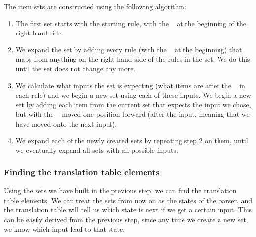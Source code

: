 The item sets are constructed using the following algorithm:
\begin{enumerate}
\item The first set starts with the starting rule, with the \textbullet ~ at the beginning of the right hand side.
\item We expand the set by adding every rule (with the \textbullet ~ at the beginning) that maps from anything on the right hand side of the rules in the set. We do this until the set does not change any more.
\item We calculate what inputs the set is expecting (what items are after the \textbullet ~ in each rule) and we begin a new set using each of these inputs. We begin a new set by adding each item from the current set that expects the input we chose, but with the \textbullet ~ moved one position forward (after the input, meaning that we have moved onto the next input).
\item We expand each of the newly created sets by repeating step 2 on them, until we eventually expand all sets with all possible inputs.
\end{enumerate}
\subsubsection{Finding the translation table elements} 
Using the sets we have built in the previous step, we can find the translation table elements. We can treat the sets from now on as the states of the parser, and the translation table will tell us which state is next if we get a certain input. This can be easily derived from the previous step, since any time we create a new set, we know which input lead to that state.
